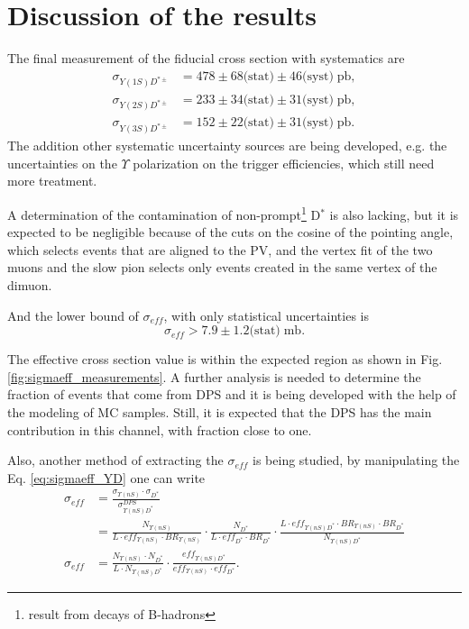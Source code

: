 \section{Discussion of the results}\label{sec:discussion}

The final measurement of the fiducial cross section with systematics are
\begin{equation}
  \begin{split}
    \sigma_{Y(1S)D^{*\pm}} &= 478 \pm 68 \text{(stat)} \pm 46 \text{(syst)} \; \text{pb},\\
    \sigma_{Y(2S)D^{*\pm}} &= 233 \pm 34 \text{(stat)} \pm 31 \text{(syst)} \; \text{pb},\\
    \sigma_{Y(3S)D^{*\pm}} &= 152 \pm 22 \text{(stat)} \pm 31 \text{(syst)} \; \text{pb}.
  \end{split}
\end{equation}
The addition other systematic uncertainty sources are being developed, e.g. the uncertainties on the $\Upsilon$ polarization on the trigger efficiencies, which still need more treatment.

A determination of the contamination of non-prompt\footnote{result from decays of B-hadrons} D$^*$ is also lacking, but it is expected to be negligible because of the cuts on the cosine of the pointing angle, which selects events that are aligned to the PV, and the vertex fit of the two muons and the slow pion selects only events created in the same vertex of the dimuon.

And the lower bound of $\sigma_{eff}$, with only statistical uncertainties is
\begin{equation}
  \sigma_{eff} > 7.9 \pm 1.2 \text{(stat)} \; \text{mb}.
\end{equation}

The effective cross section value is within the expected region as shown in Fig. \ref{fig:sigmaeff_measurements}. A further analysis is needed to determine the fraction of events that come from DPS and it is being developed with the help of the modeling of MC samples. Still, it is expected that the DPS has the main contribution in this channel, with fraction close to one.

Also, another method of extracting the $\sigma_{eff}$ is being studied, by manipulating the Eq. \ref{eq:sigmaeff_YD} one can write
\begin{equation}
  \begin{split}
    \sigma_{eff} &= \frac{\sigma_{\Upsilon(nS)} \cdot \sigma_{D^*}}{\sigma_{\Upsilon(nS) D^*}^{DPS}} \\
    &= \frac{N_{\Upsilon(nS)}}{L \cdot eff_{\Upsilon(nS)} \cdot BR_{\Upsilon(nS)}} \cdot \frac{N_{D^*}}{L \cdot eff_{D^*} \cdot BR_{D^*}} \cdot \frac{L \cdot eff_{\Upsilon(nS) D^*} \cdot BR_{\Upsilon(nS)} \cdot BR_{D^*}}{N_{\Upsilon(nS) D^*}} \\
    \sigma_{eff} &= \frac{N_{\Upsilon(nS)} \cdot N_{D^*}}{L \cdot N_{\Upsilon(nS) D^*}} \cdot \frac{eff_{\Upsilon(nS) D^*}}{eff_{\Upsilon(nS)} \cdot eff_{D^*}}.
  \end{split}
\end{equation}

